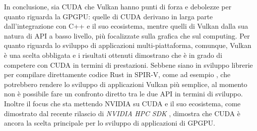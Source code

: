 
In conclusione, sia CUDA che Vulkan hanno punti di forza e debolezze per quanto riguarda la GPGPU: quelle di CUDA derivano in larga parte dall'integrazione con C++ e il suo ecosistema, mentre quelli di Vulkan dalla sua natura di API a basso livello, più focalizzate sulla grafica che sul computing. Per quanto riguarda lo sviluppo di applicazioni multi-piattaforma, comunque, Vulkan è una scelta obbligata e i risultati ottenuti dimostrano che è in grado di competere con CUDA in termini di prestazioni. Sebbene siano in sviluppo librerie per compilare direttamente codice Rust in SPIR-V, come ad esempio \cite[]{KG:rspirv}, che potrebbero rendere lo sviluppo di applicazioni Vulkan più semplice, al momento non è possibile fare un confronto diretto tra le due API in termini di sviluppo. Inoltre il focus che sta mettendo NVIDIA su CUDA e il suo ecosistema, come dimostrato dal recente rilascio di \textit{NVIDIA HPC SDK} \cite[]{NVIDIA:hpc_sdk}, dimostra che CUDA è ancora la scelta principale per lo sviluppo di applicazioni di GPGPU. 

